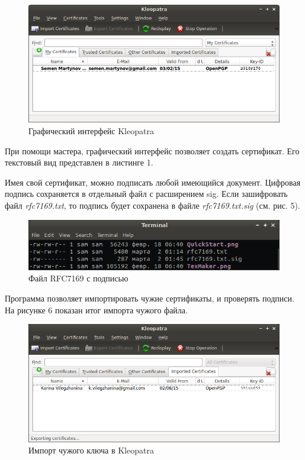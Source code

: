 \documentclass[a4paper, 12pt]{article}		%
\begin{document}
\begin{figure}[h!]
\centering
\includegraphics[scale=0.67]{res/Kleopatra}
\caption{Графический интерфейс Kleopatra}
\end{figure}

При помощи мастера, графический интерфейс позволяет создать сертификат. Его текстовый вид представлен в листинге 1.



Имея свой сертификат, можно подписать любой имеющийся документ. Цифровая подпись сохраняется в отдельный файл с расширением sig. Если зашифровать файл \textit{rfc7169.txt}, то подпись будет сохранена в файле \textit{rfc7169.txt.sig} (см. рис. 5).

\begin{figure}[h!]
\centering
\includegraphics[scale=0.8]{res/rfcsig}
\caption{Файл RFC7169 с подписью}
\end{figure}

Программа позволяет импортировать чужие сертификаты, и проверять подписи. На рисунке 6 показан итог импорта чужого файла.

\begin{figure}[h!]
\centering
\includegraphics[scale=0.67]{res/Kleopatra2}
\caption{Импорт чужого ключа в Kleopatra}
\end{figure}
\end{document}
